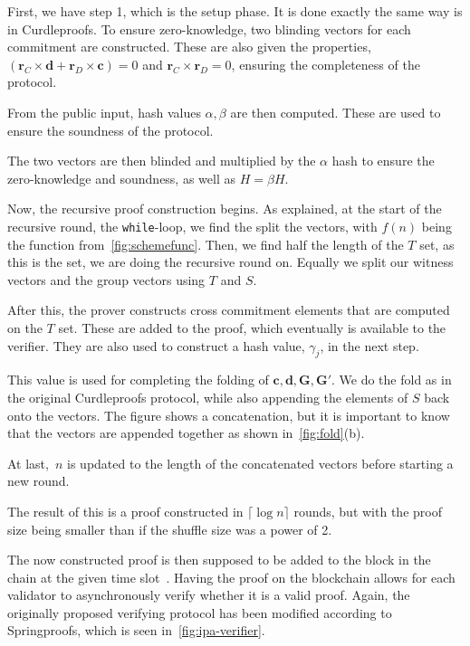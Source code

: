 First, we have step 1, which is the setup phase.
It is done exactly the same way is in Curdleproofs.
To ensure zero-knowledge, two blinding vectors for each commitment are constructed.
These are also given the properties, $(\mathbf{r}_C\times \mathbf{d}+\mathbf{r}_D\times \mathbf{c})=0$ and $\mathbf{r}_C\times\mathbf{r}_D=0$, ensuring the completeness of the protocol.

From the public input, hash values $\alpha,\beta$ are then computed.
These are used to ensure the soundness of the protocol.

The two vectors are then blinded and multiplied by the $\alpha$ hash to ensure the zero-knowledge and soundness, as well as $H=\beta H$.


Now, the recursive proof construction begins.
As explained, at the start of the recursive round, the \texttt{while}-loop, we find the split the vectors, with $f(n)$ being the function from~\autoref{fig:schemefunc}.
Then, we find half the length of the $T$ set, as this is the set, we are doing the recursive round on.
Equally we split our witness vectors and the group vectors using $T$ and $S$.

After this, the prover constructs cross commitment elements that are computed on the $T$ set.
These are added to the proof, which eventually is available to the verifier.
They are also used to construct a hash value, $\gamma_j$, in the next step.

This value is used for completing the folding of $\mathbf{c},\mathbf{d},\mathbf{G},\mathbf{G'}$.
We do the fold as in the original Curdleproofs protocol, while also appending the elements of $S$ back onto the vectors.
The figure shows a concatenation, but it is important to know that the vectors are appended together as shown in~\autoref{fig:fold}(b).

At last,~$n$ is updated to the length of the concatenated vectors before starting a new round.

The result of this is a proof constructed in $\lceil \log n \rceil$ rounds, but with the proof size being smaller than if the shuffle size was a power of 2.

The now constructed proof is then supposed to be added to the block in the chain at the given time slot~\cite{Whisk2024}.
Having the proof on the blockchain allows for each validator to asynchronously verify whether it is a valid proof.
Again, the originally proposed verifying protocol has been modified according to Springproofs, which is seen in~\autoref{fig:ipa-verifier}.

